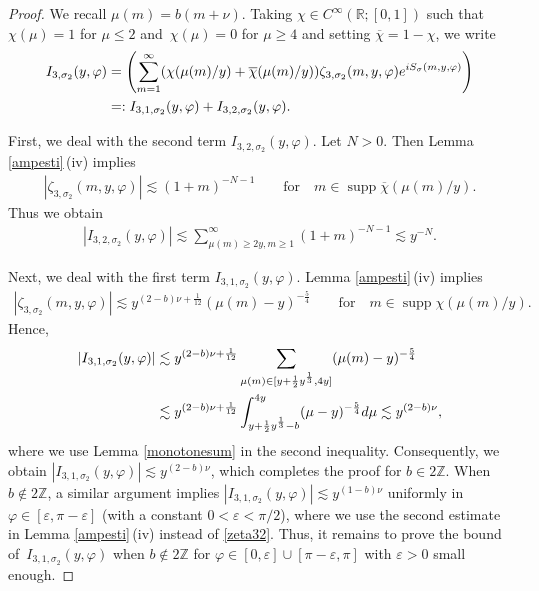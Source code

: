 \documentclass[10pt,a4paper]{article}
\numberwithin{equation}{section}
\def\R{\mathbb{R}}%
\DeclareMathOperator{\supp}{supp}%
\def\e{\varepsilon}
\def\f{\varphi}
\def\m{\mu}
\def\n{\nu}
\def\s{\sigma}
\def\z{\zeta}
\begin{document}
\begin{proof}We recall $\m(m)=b(m+\n)$. Taking $\chi\in C^{\infty}(\R;[0,1])$ such that $\chi(\m)=1$ for $\m\leq 2$ and~${\chi(\m)=0}$ for $\m\geq 4$ and setting $\overline{\chi}=1-\chi$, we write
\begin{align*}
I_{3,\s_2}(y,\f)&= \left(\sum_{m=1}^{\infty}(\chi(\m(m)/y)+\overline{\chi}(\m(m)/y)) \z_{3,\s_2}(m,y,\f){\rm e}^{{\rm i}S_{\s}(m,y,\f)} \right)\\
&=: I_{3,1,\s_2}(y,\f)+I_{3,2,\s_2}(y,\f).
\end{align*}

First, we deal with the second term $I_{3,2,\s_2}(y,\f)$. Let $N>0$. Then Lemma \ref{ampesti}\,(iv) implies
\begin{align*}
|\z_{3,\s_2}(m,y,\f)|\lesssim (1+m)^{-N-1}\qquad \text{for}\quad m\in \supp \overline{\chi}(\m(m)/y).
\end{align*}
Thus we obtain
\begin{align*}
|I_{3,2,\s_2}(y,\f)|\lesssim \sum_{\m(m)\geq 2y,m\geq 1}^{\infty}(1+m)^{-N-1}\lesssim y^{-N}.
\end{align*}

Next, we deal with the first term $I_{3,1,\s_2}(y,\f)$. Lemma \ref{ampesti}\,(iv) implies
\begin{align}\label{zeta32}
|\z_{3,\s_2}(m,y,\f)|\lesssim y^{(2-b)\n+\frac{1}{12}}(\m(m)-y)^{-\frac{5}{4}}\qquad \text{for}\quad m\in \supp \chi(\m(m)/y).
\end{align}
Hence,
\begin{align*}
|I_{3,1,\s_2}(y,\f)|\lesssim{}& y^{(2-b)\n+\frac{1}{12}}\sum_{\m(m)\in [y+\frac{1}{2}y^{\frac{1}{3}},4y]}(\m(m)-y)^{-\frac{5}{4}}\\
\lesssim{}& y^{(2-b)\n+\frac{1}{12}}\int_{y+\frac{1}{2}y^{\frac{1}{3}}-b}^{4y}(\m-y)^{-\frac{5}{4}}{\rm d}\m
\lesssim y^{(2-b)\n},
\end{align*}
where we use Lemma \ref{monotonesum} in the second inequality.
Consequently, we obtain $|I_{3,1,\s_2}(y,\f)|\lesssim y^{(2-b)\n}$, which completes the proof for $b\in 2\mathbb{Z}$. When $b\notin 2\mathbb{Z}$, a similar argument implies $|I_{3,1,\s_2}(y,\f)|\lesssim y^{(1-b)\n}$ uniformly in $ \f\in [\e,\pi-\e]$ (with a constant $0<\e<\pi/2$), where we use the second estimate in Lemma \ref{ampesti}\,(iv) instead of \eqref{zeta32}. Thus, it remains to prove the bound of~${I_{3,1,\s_2}(y,\f)}$ when $b\notin 2\mathbb{Z}$ for $\f\in [0,\e]\cup [\pi-\e,\pi]$ with $\e>0$ small enough.


\end{proof}
\end{document}
